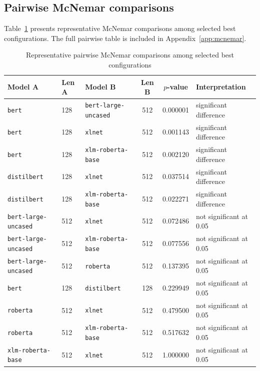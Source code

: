\documentclass[11pt]{article}
\begin{document}
\subsection{Pairwise McNemar comparisons}

Table~\ref{tab:mcnemar-selected} presents representative McNemar comparisons among selected best configurations. The full pairwise table is included in Appendix~\ref{app:mcnemar}.

\begin{table}[H]
\centering
\caption{Representative pairwise McNemar comparisons among selected best configurations}
\label{tab:mcnemar-selected}
\small
\begin{tabular}{lllccl}
\toprule
Model A & Len A & Model B & Len B & $p$-value & Interpretation \\
\midrule
\texttt{bert} & 128 & \texttt{bert-large-uncased} & 512 & 0.000001 & significant difference \\
\texttt{bert} & 128 & \texttt{xlnet} & 512 & 0.001143 & significant difference \\
\texttt{bert} & 128 & \texttt{xlm-roberta-base} & 512 & 0.002120 & significant difference \\
\texttt{distilbert} & 128 & \texttt{xlnet} & 512 & 0.037514 & significant difference \\
\texttt{distilbert} & 128 & \texttt{xlm-roberta-base} & 512 & 0.022271 & significant difference \\
\texttt{bert-large-uncased} & 512 & \texttt{xlnet} & 512 & 0.072486 & not significant at 0.05 \\
\texttt{bert-large-uncased} & 512 & \texttt{xlm-roberta-base} & 512 & 0.077556 & not significant at 0.05 \\
\texttt{bert-large-uncased} & 512 & \texttt{roberta} & 512 & 0.137395 & not significant at 0.05 \\
\texttt{bert} & 128 & \texttt{distilbert} & 128 & 0.229949 & not significant at 0.05 \\
\texttt{roberta} & 512 & \texttt{xlnet} & 512 & 0.479500 & not significant at 0.05 \\
\texttt{roberta} & 512 & \texttt{xlm-roberta-base} & 512 & 0.517632 & not significant at 0.05 \\
\texttt{xlm-roberta-base} & 512 & \texttt{xlnet} & 512 & 1.000000 & not significant at 0.05 \\
\bottomrule
\end{tabular}
\end{table}
\end{document}
